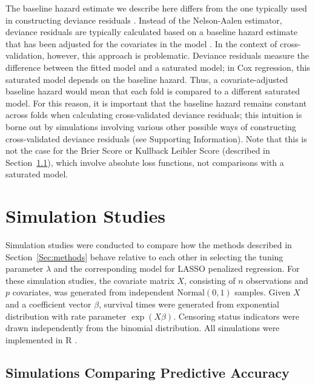 The baseline hazard estimate we describe here differs from the one typically used in constructing deviance residuals \citep{Therneau1990}. Instead of the Nelson-Aalen estimator, deviance residuals are typically calculated based on a baseline hazard estimate that has been adjusted for the covariates in the model \citep{breslow1972}. In the context of cross-validation, however, this approach is problematic. Deviance residuals measure the difference between the fitted model and a saturated model; in Cox regression, this saturated model depends on the baseline hazard. Thus, a covariate-adjusted baseline hazard would mean that each fold is compared to a different saturated model. For this reason, it is important that the baseline hazard remains constant across folds when calculating cross-validated deviance residuals; this intuition is borne out by simulations involving various other possible ways of constructing cross-validated deviance residuals (see Supporting Information).  Note that this is not the case for the Brier Score or Kullback Leibler Score (described in Section~\ref{Sec:accuracy}), which involve absolute loss functions, not comparisons with a saturated model.

\section{Simulation Studies}

Simulation studies were conducted to compare how the methods described in Section~\ref{Sec:methods} behave relative to each other in selecting the tuning parameter $\lambda$ and the corresponding model for LASSO penalized regression. For these simulation studies, the covariate matrix $X$, consisting of $n$ observations and $p$ covariates, was generated from independent $\text{Normal}(0, 1)$ samples. Given $X$ and a coefficient vector $\beta$, survival times were generated from exponential distribution with rate parameter $\exp(X\beta)$. Censoring status indicators were drawn independently from the binomial distribution. All simulations were implemented in R \citep{R}. 
   
\subsection {Simulations Comparing Predictive Accuracy}
\label{Sec:accuracy}


